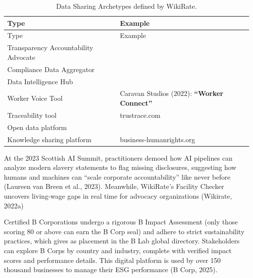 \documentclass[
  12pt,
  letterpaper,
  DIV=11,
  numbers=noendperiod]{scrartcl}
\begin{document}
\def\pandoctableshortcapt{Data Sharing Archetypes}

\begin{longtable}[]{@{}
  >{\raggedright\arraybackslash}p{}
  >{\raggedright\arraybackslash}p{}@{}}
\caption[Data Sharing Archetypes]{Data Sharing Archetypes defined by
WikiRate.}\tabularnewline
\toprule\noalign{}
\begin{minipage}[b]{\linewidth}\raggedright
Type
\end{minipage} & \begin{minipage}[b]{\linewidth}\raggedright
Example
\end{minipage} \\
\midrule\noalign{}
\endfirsthead
\toprule\noalign{}
\begin{minipage}[b]{\linewidth}\raggedright
Type
\end{minipage} & \begin{minipage}[b]{\linewidth}\raggedright
Example
\end{minipage} \\
\midrule\noalign{}
\endhead
\bottomrule\noalign{}
\endlastfoot
Transparency Accountability Advocate & \\
Compliance Data Aggregator & \\
Data Intelligence Hub & \\
Worker Voice Tool & Caravan Studios (2022): \textbf{``Worker
Connect''} \\
Traceability tool & trustrace.com \\
Open data platform & \\
Knowledge sharing platform & business-humanrights.org \\
\end{longtable}

\let\pandoctableshortcapt\relax

At the 2023 Scottish AI Summit, practitioners demoed how AI pipelines
can analyze modern slavery statements to flag missing disclosures,
suggesting how humans and machines can ``scale corporate
accountability'' like never before (Laureen van Breen et al., 2023).
Meanwhile, WikiRate's Facility Checker uncovers living-wage gaps in real
time for advocacy organizations (Wikirate, 2022a)

Certified B Corporations undergo a rigorous B Impact Assessment (only
those scoring 80 or above can earn the B Corp seal) and adhere to strict
sustainability practices, which gives as placement in the B Lab global
directory. Stakeholders can explore B Corps by country and industry,
complete with verified impact scores and performance details. This
digital platform is used by over 150 thousand businesses to manage their
ESG performance (B Corp, 2025).
\end{document}
